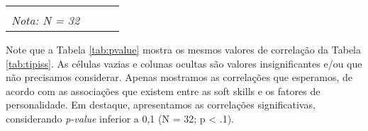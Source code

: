 \begin{sidewaystable}[ph!]
\begin{tabular}{lccc}
    \bottomrule
		\multicolumn{1}{l}{\textbf{}} & & & \\
		\multicolumn{1}{l}{\textit{Nota: N = 32}} & & & \\
    
		
\end{tabular}
\label{tab:pvalue}
\end{sidewaystable}

Note que a Tabela \ref{tab:pvalue} mostra os mesmos valores de correlação da Tabela \ref{tab:tipiss}. 
As células vazias e colunas ocultas são valores insignificantes e/ou que não precisamos considerar.
Apenas mostramos as correlações que esperamos, de acordo com as associações que existem entre as soft skills e os fatores de personalidade.
Em destaque, apresentamos as correlações significativas, considerando \textit{p-value} inferior a 0,1 (N = 32; p < .1).
